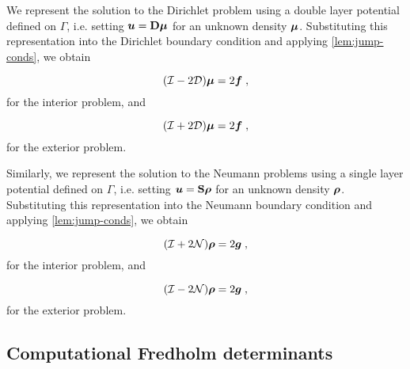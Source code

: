 We represent
the solution to the Dirichlet problem using
a double layer potential defined on $\Gamma$, i.e.
setting ${\boldsymbol u} = {\bf D} {\boldsymbol \mu}$ for
an unknown density ${\boldsymbol \mu}$. Substituting this representation
into the Dirichlet boundary condition and applying
\cref{lem:jump-conds}, we obtain

\begin{equation}
  (\mathcal I - 2{\mathcal D}) {\boldsymbol \mu} = 2{\boldsymbol f} \; , \label{eq:inteq_dir_int}
\end{equation}
for the interior problem, and

\begin{equation}
  (\mathcal I + 2{\mathcal D}) {\boldsymbol \mu} = 2{\boldsymbol f} \; , \label{eq:inteq_dir_ext}
\end{equation}
for the exterior problem.

Similarly, we represent
the solution to the Neumann problems using
a single layer potential defined on $\Gamma$, i.e.
setting ${\boldsymbol u} = {\bf S} {\boldsymbol \rho}$ for
an unknown density ${\boldsymbol \rho}$. Substituting this representation
into the Neumann boundary condition and applying
\cref{lem:jump-conds}, we obtain

\begin{equation}
  (\mathcal I + 2{\mathcal N}) {\boldsymbol \rho} = 2{\boldsymbol g} \; , \label{eq:inteq_neu_int}
\end{equation}
for the interior problem, and

\begin{equation}
  (\mathcal I - 2{\mathcal N}) {\boldsymbol \rho} = 2{\boldsymbol g} \; , \label{eq:inteq_neu_ext}
\end{equation}
for the exterior problem.


\subsection{Computational Fredholm determinants}
